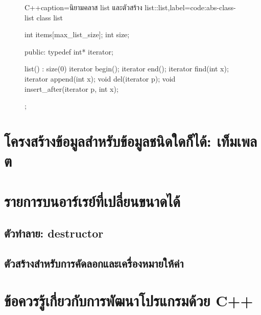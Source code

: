 \begin{figure}
\latintext
\begin{codelist}{C++}{caption={\thaitext นิยาม{\wbr}ค{\wbr}ลา{\wbr}ส {\ct list} และ{\wbr}ตัว{\wbr}สร้าง {\ct list::list}\latintext},label=code:abs-class-list}
class list {
  int items[max_list_size];
  int size;

public:
  typedef int* iterator;

  list() : size(0) {}
  iterator begin();
  iterator end();
  iterator find(int x);
  iterator append(int x);
  void del(iterator p);
  void insert_after(iterator p, int x);
};
\end{codelist}
\thaitext
\end{figure}

\section{โครงสร้าง{\wbr}ข้อมูล{\wbr}สำหรับ{\wbr}ข้อมูล{\wbr}ชนิด{\wbr}ใด{\wbr}ก็ได้: เท็ม{\wbr}เพล{\wbr}ต}

\section{รายการ{\wbr}บน{\wbr}อาร์เรย์{\wbr}ที่{\wbr}เปลี่ยน{\wbr}ขนาด{\wbr}ได้}

\subsection{ตัว{\wbr}ทำลาย: destructor}
\subsection{ตัว{\wbr}สร้าง{\wbr}สำหรับ{\wbr}การ{\wbr}คัดลอก{\wbr}และ{\wbr}เครื่องหมาย{\wbr}ให้{\wbr}ค่า}

\section{ข้อ{\wbr}ควร{\wbr}รู้{\wbr}เกี่ยวกับ{\wbr}การ{\wbr}พัฒนา{\wbr}โปรแกรม{\wbr}ด้วย C++}
